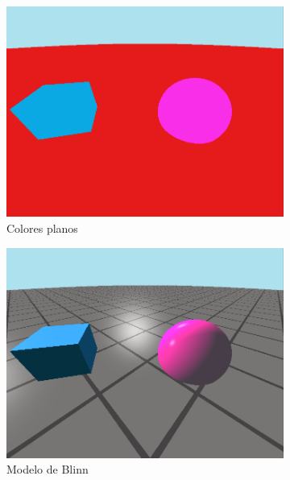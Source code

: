 \begin{figure}[ht!]
    \centering
    \begin{subfigure}[b]{0.3\textwidth}
        \centering
        \includegraphics[width=\textwidth]{Plantilla-TFG-master/img/escena1_plana.png}
        \caption{Colores planos}
    \end{subfigure}
    \hfill
    \begin{subfigure}[b]{0.3\textwidth}
        \centering
        \includegraphics[width=\textwidth]{Plantilla-TFG-master/img/escena2_blinn.png}
        \caption{Modelo de Blinn}
    \end{subfigure}
    \hfill
    \begin{subfigure}[b]{0.3\textwidth}

\end{subfigure}
\end{figure}
